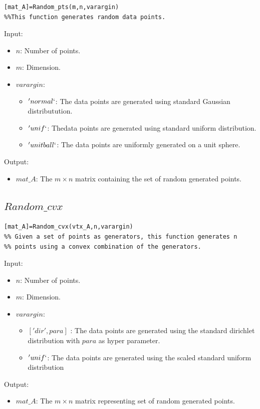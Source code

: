 \documentclass[a4paper,12pt]{article}
\begin{document}
\begin{verbatim}
[mat_A]=Random_pts(m,n,varargin)
%%This function generates random data points.
\end{verbatim}

\noindent Input:
\begin{itemize}
	\item {$n$:}
	Number of points. 
	\item {$m$:}
	Dimension.
	\item {$varargin$:}
	\begin{itemize}
		\item 
		$'normal` $: The data points are generated using standard Gaussian distributution.
		\item 
		$'unif` $: Thedata points are generated using  standard uniform distribution.
		\item 
		$'unit ball`$: The data points are uniformly generated on a unit sphere.
	\end{itemize}

\end{itemize}
Output:
\begin{itemize}
	\item {$mat\_A$:}
	The $m \times n$ matrix containing the set of random generated points.
\end{itemize}

\subsection{$Random\_cvx$}
\begin{verbatim}
[mat_A]=Random_cvx(vtx_A,n,varargin)
%% Given a set of points as generators, this function generates n 
%% points using a convex combination of the generators. 
\end{verbatim}

\noindent Input:
\begin{itemize}
	\item {$n$:}
	Number of points. 
	\item {$m$:}
	Dimension.
	\item {$varargin$:}
	\begin{itemize}
		\item 
		$['dir',para]$ :  The data points are generated using the standard dirichlet distribution with $para$ as hyper parameter.
		\item 
		$'unif`$:  The data points are generated using the scaled standard uniform distribution
	\end{itemize}
\end{itemize}
Output:
\begin{itemize}
		\item {$mat\_A$:}
	The $m \times n$ matrix representing set of random generated points.
\end{itemize}
\end{document}
